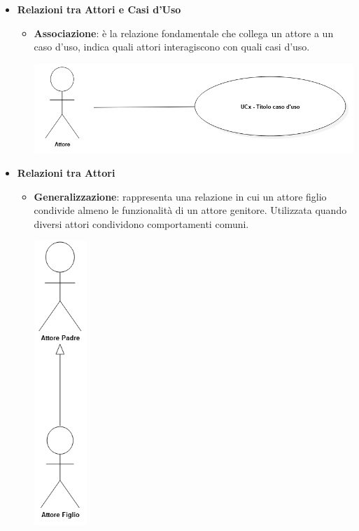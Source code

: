 \begin{itemize}
	\item \textbf{Relazioni tra Attori e Casi d'Uso}
	    \begin{itemize}
			\item \textbf{Associazione}: è la relazione fondamentale che collega un attore a un caso d'uso, indica quali attori interagiscono con quali casi d'uso. 
				\begin{center}
					\includegraphics*[width=15cm]{../../../images/norme_di_progetto/associazione.png}
				\end{center}
	    \end{itemize} 
	
	\item \textbf{Relazioni tra Attori}
		\begin{itemize}
			\item \textbf{Generalizzazione}: rappresenta una relazione in cui un attore figlio condivide almeno le funzionalità di un attore genitore. Utilizzata quando diversi attori condividono comportamenti comuni. 
				\begin{center}
					\includegraphics*[width=2cm]{../../../images/norme_di_progetto/generalizzazioneTraAttori.png}
				\end{center}
		\end{itemize}
	\newpage
	

\end{itemize}
